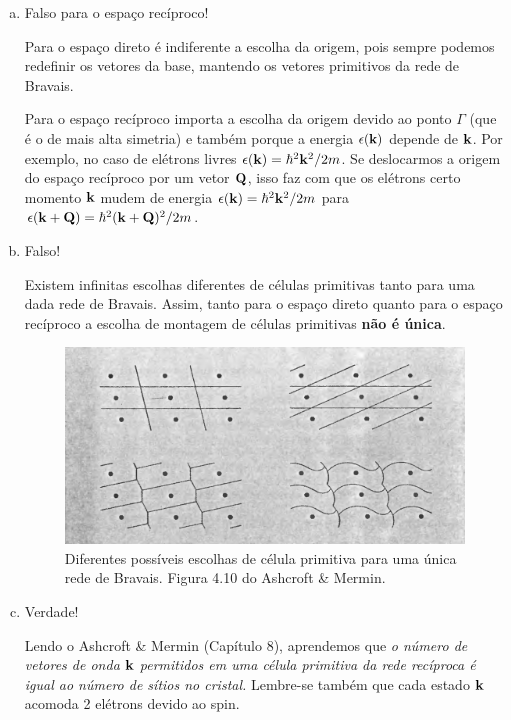 \documentclass[a4paper,10pt]{article}
\begin{document}
\begin{enumerate}[(a)]
\item Falso para o espaço recíproco!

Para o espaço direto é indiferente a escolha da origem, pois sempre podemos redefinir os vetores da base, mantendo os vetores primitivos da rede de Bravais.

Para o espaço recíproco importa a escolha da origem devido ao ponto $\Gamma$ (que é o de mais alta simetria) e também porque a energia $\epsilon({\vb{k}})$ depende de ${\vb{k}}$. Por exemplo, no caso de elétrons livres $\epsilon({\vb{k}}) = \hbar^2 {\vb{k}}^2 / 2m$. Se deslocarmos a origem do espaço recíproco por um vetor $\vb{Q}$, isso faz com que os elétrons certo momento ${\vb{k}}$ mudem de energia $\epsilon({\vb{k}}) = \hbar^2 {\vb{k}}^2 / 2m$ para $\epsilon({\vb{k}}+\vb{Q}) = \hbar^2 ({\vb{k}}+\vb{Q})^2 / 2m$.

\item Falso!

Existem infinitas escolhas diferentes de células primitivas tanto para uma dada rede de Bravais. Assim, tanto para o espaço direto quanto para o espaço recíproco a escolha de montagem de células primitivas \textbf{não é única}.

\begin{figure}[H]
\centering
\includegraphics[width=\linewidth]{fig/primitive_cells.png}
\caption{Diferentes possíveis escolhas de célula primitiva para uma única rede de Bravais. Figura 4.10 do Ashcroft \& Mermin.}
\label{fig:primitive_cells}
\end{figure}


\item Verdade!

Lendo o Ashcroft \& Mermin (Capítulo 8), aprendemos que \textit{o número de vetores de onda ${\vb{k}}$ permitidos em uma célula primitiva da rede recíproca é igual ao número de sítios no cristal.} Lembre-se também que cada estado ${\vb{k}}$ acomoda 2 elétrons devido ao spin.


\end{enumerate}
\end{document}
